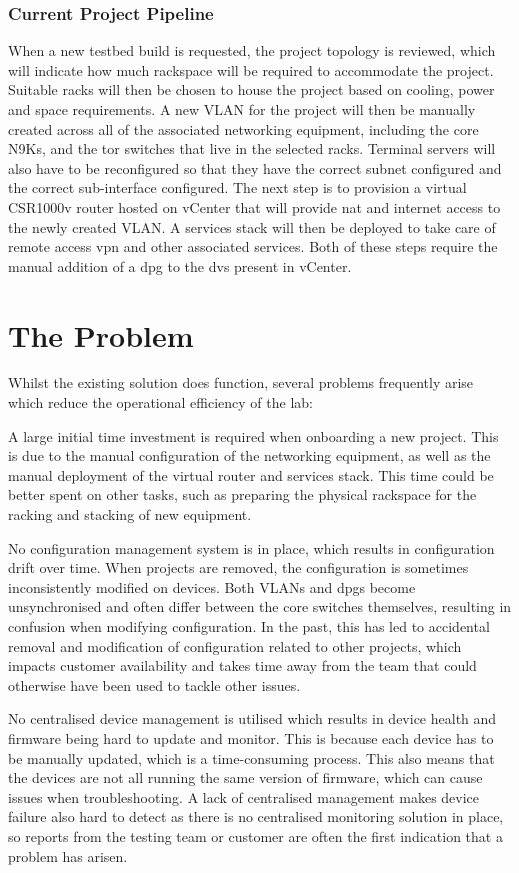 \subsubsection{Current Project Pipeline}
When a new testbed build is
requested, the project topology is reviewed, which will indicate how much
rackspace will be required to accommodate the project. Suitable racks will then
be chosen to house the project based on cooling, power and space requirements.
A new VLAN for the project will then be manually created across all of the
associated networking equipment, including the core N9Ks, and the \gls{tor}
switches that live in the selected racks. Terminal servers will also have to be
reconfigured so that they have the correct subnet configured and the correct
sub-interface configured. The next step is to provision a virtual CSR1000v
router hosted on vCenter that will provide \gls{nat} and internet access to the
newly created VLAN. A services stack will then be deployed to take care of
remote access \gls{vpn} and other associated services. Both of these steps
require the manual addition of a \gls{dpg} to the \gls{dvs} present in vCenter.
\section{The Problem}
\label{intro:problem}
Whilst the existing solution does
function, several problems frequently arise which reduce the operational
efficiency of the lab:

A large initial time investment is required when
onboarding a new project. This is due to the manual configuration of the
networking equipment, as well as the manual deployment of the virtual router
and services stack. This time could be better spent on other tasks, such as
preparing the physical rackspace for the racking and stacking of new equipment.

No configuration management system is in place, which results in configuration
drift over time. When projects are removed, the configuration is sometimes
inconsistently modified on devices. Both VLANs and \gls{dpg}s become
unsynchronised and often differ between the core switches themselves, resulting
in confusion when modifying configuration. In the past, this has led to
accidental removal and modification of configuration related to other projects,
which impacts customer availability and takes time away from the team that
could otherwise have been used to tackle other issues.

No centralised device
management is utilised which results in device health and firmware being hard to update and monitor.
This is because each device has to be manually updated, which is a
time-consuming process. This also means that the devices are not all running
the same version of firmware, which can cause issues when troubleshooting. A
lack of centralised management makes device failure also hard to detect as there is no
centralised monitoring solution in place, so reports from the testing team or
customer are often the first indication that a problem has arisen.

